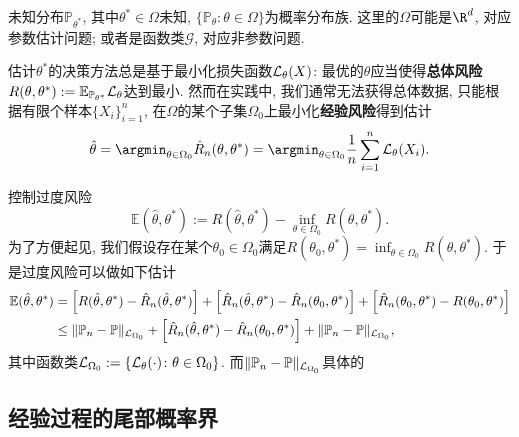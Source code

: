 未知分布$\mathbb{P}_{\theta^*}$, 其中$\theta^* \in \Omega$未知, $\{ \mathbb{P}_{\theta} \colon \theta \in \Omega\}$为概率分布族. 
这里的$\Omega$可能是$\R^d$, 对应参数估计问题; 或者是函数类$\mathscr{G}$, 对应非参数问题. 

估计$\theta^*$的决策方法总是基于最小化损失函数$\mathcal{L}_{\theta} (X)$: 最优的$\theta$应当使得\textbf{总体风险}$R(\theta, \theta^*) := \mathbb{E}_{\mathbb{P}_{\theta^*}}\mathcal{L}_{\theta}$达到最小. 
然而在实践中, 我们通常无法获得总体数据, 只能根据有限个样本$\{ X_i \}_{i=1}^n$, 在$\Omega$的某个子集$\Omega_0$上最小化\textbf{经验风险}得到估计
\begin{equation*}
	\hat \theta 
	= \argmin_{\theta \in \Omega_0} \hat R_n (\theta, \theta^*) 
	= \argmin_{\theta \in \Omega_0} \frac{1}{n} \sum_{i=1}^n \cL_{\theta}(X_i). 
\end{equation*}


控制过度风险
\begin{equation*}
	\mathbb{E}(\hat \theta, \theta^*)
	:= R(\hat \theta, \theta^*) - \inf_{\theta \in \Omega_0} R(\theta, \theta^*). 
\end{equation*}
为了方便起见, 我们假设存在某个$\theta_0 \in \Omega_0$满足$R(\theta_0, \theta^*) = \inf_{\theta \in \Omega_0}R(\theta, \theta^*)$. 
于是过度风险可以做如下估计
\begin{align*}
	\mathbb{E}(\hat \theta, \theta^*)
	&= \left[ R(\hat \theta, \theta^*) - \hat R_n(\hat \theta, \theta^*) \right] 
	+ \left[ \hat R_n(\hat \theta, \theta^*) - \hat R_n(\theta_0, \theta^*) \right]
	+ \left[ \hat R_n(\theta_0, \theta^*) - R(\theta_0, \theta^*) \right] \\
	&\leq \|\mathbb{P}_n - \mathbb{P}\|_{\mathcal{L}_{\Omega_0}} 
	+ \left[ \hat R_n(\hat \theta, \theta^*) - \hat R_n(\theta_0, \theta^*) \right]
	+ \|\mathbb{P}_n - \mathbb{P}\|_{\mathcal{L}_{\Omega_0}}, 
\end{align*}
其中函数类$\mathcal{L}_{\Omega_0} := \{ \mathcal{L}_{\theta}(\cdot) \colon \theta \in \Omega_0 \}$. 
而$\|\mathbb{P}_n - \mathbb{P}\|_{\mathcal{L}_{\Omega_0}}$具体的




\subsection{经验过程的尾部概率界}

